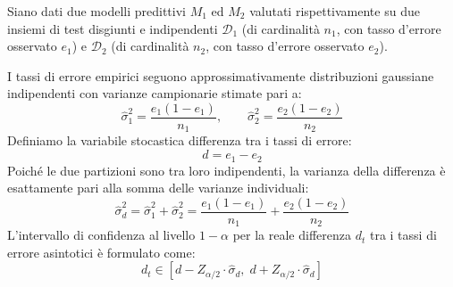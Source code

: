 Siano dati due modelli predittivi $M_1$ ed $M_2$ valutati rispettivamente su due insiemi di test disgiunti e indipendenti $\mathcal{D}_1$ (di cardinalità $n_1$, con tasso d'errore osservato $e_1$) e $\mathcal{D}_2$ (di cardinalità $n_2$, con tasso d'errore osservato $e_2$).

I tassi di errore empirici seguono approssimativamente distribuzioni gaussiane indipendenti con varianze campionarie stimate pari a:
\begin{equation}
    \hat{\sigma}_1^2 = \frac{e_1(1 - e_1)}{n_1}, \qquad \hat{\sigma}_2^2 = \frac{e_2(1 - e_2)}{n_2}
\end{equation}
Definiamo la variabile stocastica differenza tra i tassi di errore:
\begin{equation}
    d = e_1 - e_2
\end{equation}
Poiché le due partizioni sono tra loro indipendenti, la varianza della differenza è esattamente pari alla somma delle varianze individuali:
\begin{equation}
    \hat{\sigma}_d^2 = \hat{\sigma}_1^2 + \hat{\sigma}_2^2 = \frac{e_1(1 - e_1)}{n_1} + \frac{e_2(1 - e_2)}{n_2}
\end{equation}
L'intervallo di confidenza al livello $1 - \alpha$ per la reale differenza $d_t$ tra i tassi di errore asintotici è formulato come:
\begin{equation}
    d_t \in \left[ d - Z_{\alpha/2} \cdot \hat{\sigma}_d, \; d + Z_{\alpha/2} \cdot \hat{\sigma}_d \right]
\end{equation}

